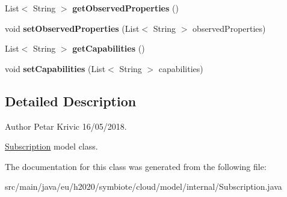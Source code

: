 \begin{DoxyCompactItemize}
List$<$ String $>$ {\bfseries get\+Observed\+Properties} ()
\item 
\mbox{\label{classeu_1_1h2020_1_1symbiote_1_1cloud_1_1model_1_1internal_1_1Subscription_a1dfa444e0904dd3b8f9bc5ef4f9acd72}} 
void {\bfseries set\+Observed\+Properties} (List$<$ String $>$ observed\+Properties)
\item 
\mbox{\label{classeu_1_1h2020_1_1symbiote_1_1cloud_1_1model_1_1internal_1_1Subscription_ab54d4192ff31452529fe847dcca71e4d}} 
List$<$ String $>$ {\bfseries get\+Capabilities} ()
\item 
\mbox{\label{classeu_1_1h2020_1_1symbiote_1_1cloud_1_1model_1_1internal_1_1Subscription_a02532b99e94d4fe314370fa4c4733e02}} 
void {\bfseries set\+Capabilities} (List$<$ String $>$ capabilities)
\end{DoxyCompactItemize}


\subsection{Detailed Description}
\begin{DoxyAuthor}{Author}
Petar Krivic 16/05/2018.
\end{DoxyAuthor}
\hyperlink{classeu_1_1h2020_1_1symbiote_1_1cloud_1_1model_1_1internal_1_1Subscription}{Subscription} model class. 

The documentation for this class was generated from the following file\+:\begin{DoxyCompactItemize}
\item 
src/main/java/eu/h2020/symbiote/cloud/model/internal/Subscription.\+java\end{DoxyCompactItemize}
